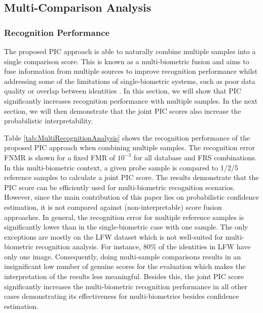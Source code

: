 \documentclass[10pt,twocolumn,letterpaper]{article}
\begin{document}
\subsection{Multi-Comparison Analysis}
\label{sec:MultiComparisonAnalysis}
\vspace{-2mm}
\subsubsection{Recognition Performance}
\label{sec:MultiRecognition}
\vspace{-2mm}
The proposed PIC approach is able to naturally combine multiple samples into a single comparison score.
This is known as a multi-biometric fusion and aims to fuse information from multiple sources to improve recognition performance whilst addressing some of the limitations of single-biometric systems, such as poor data quality \cite{DBLP:conf/cvpr/TerhorstKDKK20} or overlap between identities \cite{DBLP:journals/inffus/SinghSR19}.
In this section, we will show that PIC significantly increases recognition performance with multiple samples.
In the next section, we will then demonstrate that the joint PIC scores also increase the probabilistic interpretability.

Table \ref{tab:MultiRecognitionAnalysis} shows the recognition performance of the proposed PIC approach when combining multiple samples.
The recognition error FNMR is shown for a fixed FMR of $10^{-3}$ for all database and FRS combinations.
In this multi-biometric context, a given probe sample is compared to 1/2/5 reference samples to calculate a joint PIC score.
The results demonstrate that the PIC score can be efficiently used for multi-biometric recognition scenarios.
{However, since the main contribution of this paper lies on probabilistic confidence estimation, it is not compared against (non-interpretable) score fusion approaches.}
In general, the recognition error for multiple reference samples is significantly lower than in the single-biometric case with one sample.
The only exceptions are mostly on the LFW dataset which is not well-suited for multi-biometric recognition analysis. 
For instance, 80\% of the identities in LFW have only one image.
Consequently, doing multi-sample comparisons results in an insignificant low number of genuine scores for the evaluation which makes the interpretation of the results less meaningful.
Besides this, the joint PIC score significantly increases the multi-biometric recognition performance in all other cases demonstrating its effectiveness for multi-biometrics besides confidence estimation.
\end{document}
